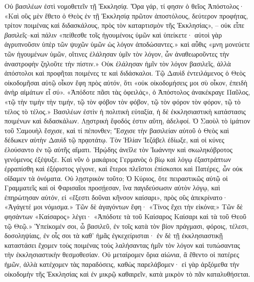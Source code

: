 \documentclass[10pt]{book}
\newcommand{\switchEnglish}{\selectlanguage{english} \switchcolumn}
\begin{document}
\begin{paracol}{2}
Οὐ βασιλέων ἐστὶ νομοθετεῖν τῇ Ἐκκλησίᾳ. Ὅρα γάρ, τί φησιν ὁ θεῖος Ἀπόστολος·
«Καὶ οὓς μὲν ἔθετο ὁ Θεὸς ἐν τῇ Ἐκκλησίᾳ πρῶτον ἀποστόλους, δεύτερον προφήτας,
τρίτον ποιμένας καὶ διδασκάλους, πρὸς τὸν καταρτισμὸν τῆς Ἐκκλησίας», – οὐκ
εἶπε \emph{βασιλεῖς}–καὶ πάλιν «πείθεσθε τοῖς ἡγουμένοις ὑμῶν καὶ ὑπείκετε· αὐτοὶ γὰρ
ἀγρυπνοῦσιν ὑπὲρ τῶν ψυχῶν ὑμῶν ὡς λόγον ἀποδώσαντες.» καὶ αὖθις «μνη μονεύετε
τῶν ἡγουμένων ὑμῶν, οἵτινες ἐλάλησαν ὑμῖν τὸν λόγον, ὧν ἀναθεωροῦντες τὴν
ἀναστροφὴν ζηλοῦτε τὴν πίστιν.» Οὐκ ἐλάλησαν ἡμῖν τὸν λόγον βασιλεῖς, ἀλλὰ
ἀπόστολοι καὶ προφῆται ποιμένες τε καὶ διδάσκαλοι. Τῷ Δαυὶδ ἐντειλάμενος ὁ
Θεὸς οἰκοδομῆσαι αὑτῷ οἶκον ἔφη πρὸς αὐτόν, ὅτι «οὐκ οἰκοδομήσεις μοι σὺ
οἶκον, ἐπειδὴ ἀνὴρ αἱμάτων εἶ σύ». «Ἀπόδοτε πᾶσι τὰς ὀφειλάς», ὁ Ἀπόστολος
ἀνακέκραγε Παῦλος, «τῷ τὴν τιμὴν τὴν τιμήν, τῷ τὸν φόβον τὸν φόβον, τῷ τὸν
φόρον τὸν φόρον, τῷ τὸ τέλος τὸ τέλος.» Βασιλέων ἐστὶν ἡ πολιτικὴ εὐταξία, ἡ
δὲ ἐκκλησιαστικὴ κατάστασις ποιμένων καὶ διδασκάλων. Λῃστρικὴ ἔφοδός ἐστιν
αὕτη, ἀδελφοί. Ὁ Σαοὺλ τὸ ἱμάτιον τοῦ Σαμουὴλ ἔσχισε, καὶ τί πέπονθεν; Ἔσχισε
τὴν βασιλείαν αὐτοῦ ὁ Θεὸς καὶ δέδωκεν αὐτὴν Δαυὶδ τῷ πρᾳοτάτῳ. Τὸν Ἡλίαν
Ἰεζάβελ ἐδίωξε, καὶ οἱ κύνες ἐλούσαντο ἐν τῷ αὐτῆς αἵματι. Ἡρῴδης ἀνεῖλε τὸν
Ἰωάννην καὶ σκωληκόβροτος γενόμενος ἐξέψυξε. Καὶ νῦν ὁ μακάριος Γερμανὸς ὁ βίῳ
καὶ λόγῳ ἐξαστράπτων ἐρραπίσθη καὶ ἐξόριστος γέγονε, καὶ ἕτεροι πλεῖστοι
ἐπίσκοποι καὶ Πατέρες, ὧν οὐκ οἴδαμεν τὰ ὀνόματα. Οὐ λῃστρικὸν τοῦτο; Ὁ
Κύριος, ὅτε πειραστικῶς αὐτῷ οἱ Γραμματεῖς καὶ οἱ Φαρισαῖοι προσῄεσαν, ἵνα
παγιδεύσωσιν αὐτὸν λόγῳ, καὶ ἐπηρώτησαν αὐτόν, εἰ «ἔξεστι δοῦναι κῆνσον
καίσαρι», πρὸς οὓς ἀπεκρίνατο· «Ἀγάγετέ μοι νόμισμα.» Τῶν δὲ ἀγαγόντων ἔφη·
«Τίνος ἔχει τὴν εἰκόνα;» Τῶν δὲ φησάντων «Καίσαρος» λέγει· «Ἀπόδοτε τὰ τοῦ
Καίσαρος Καίσαρι καὶ τὰ τοῦ Θεοῦ τῷ Θεῷ.» Ὑπείκομέν σοι, ὦ βασιλεῦ, ἐν τοῖς
κατὰ τὸν βίον πράγμασι, φόροις, τέλεσι, δοσοληψίαις, ἐν οἷς σοι τὰ καθ’ ἡμᾶς
ἐγκεχείρισται· ἐν δὲ τῇ ἐκκλησιαστικῇ καταστάσει ἔχομεν τοὺς ποιμένας τοὺς
λαλήσαντας ἡμῖν τὸν λόγον καὶ τυπώσαντας τὴν ἐκκλησιαστικὴν θεσμοθεσίαν. Οὐ
μεταίρομεν ὅρια αἰώνια, ἃ ἔθεντο οἱ πατέρες ἡμῶν, ἀλλὰ κατέχομεν τὰς
παραδόσεις, καθὼς παρελάβομεν· εἰ γὰρ ἀρξόμεθα τὴν οἰκοδομὴν τῆς Ἐκκλησίας καὶ
ἐν μικρῷ καθαιρεῖν, κατὰ μικρὸν τὸ πᾶν καταλυθήσεται.

\switchEnglish


\end{paracol}
\end{document}
